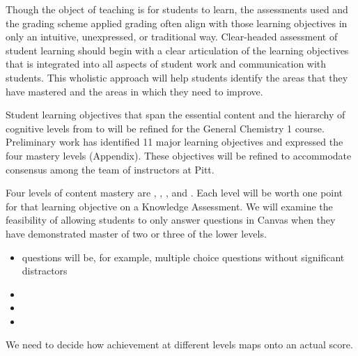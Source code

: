 \documentclass[10pt,letterpaper]{article}
\begin{document}
%
%
Though the object of teaching is for students to learn,  the assessments used and the grading scheme applied grading often align with those learning objectives in only an intuitive, unexpressed, or traditional way. Clear-headed assessment of student learning should begin with a clear articulation of the learning objectives that is integrated into all aspects of student work and communication with students. This wholistic approach will help students identify the areas that they have mastered and the areas in which  they need to improve.

Student learning objectives that span the essential content and the hierarchy of cognitive levels from \recall to \use will be refined for the General Chemistry 1 course. Preliminary work has identified 11 major learning objectives and expressed the four mastery levels (Appendix). These objectives will be refined to accommodate consensus among the team of \pogil instructors at Pitt. 


 Four levels of content mastery are \recall, \comprehension, \analysis, and \use. Each level will be worth one point for that learning objective on a Knowledge Assessment. We will examine the feasibility of allowing students to only answer \use questions in Canvas when they have demonstrated master of two or three of the lower levels. 

\begin{itemize}
\item \Recall questions will be, for example, multiple choice questions without significant distractors 
\item \Comprehension
\item \Analysis
\item \Use
\end{itemize}

 We need to decide how achievement at different levels maps onto an actual score. 
\end{document}
